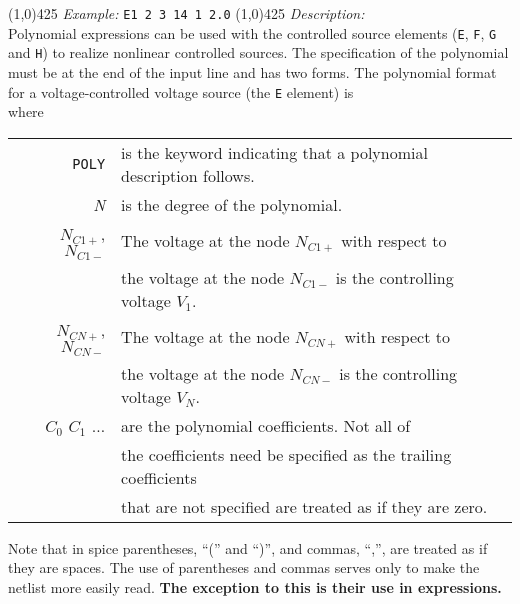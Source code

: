 \newline
\linethickness{0.5mm} \line(1,0){425}
\newline
\textit{Example:}
\newline
\texttt{E1 2 3 14 1 2.0}
\newline
\linethickness{0.5mm} \line(1,0){425}
\newline
\textit{Description:}\\
Polynomial expressions can be used with the controlled source
elements ({\tt E}, {\tt F}, {\tt G} and {\tt H}) to realize
nonlinear controlled sources. The specification of the polynomial
must be at the end of the input line and has two forms. The
polynomial format for a voltage-controlled voltage source (the
{\tt E} element) is\\[0.1in]
\hspace*{\fill}
\newline
where
\newline
\begin{tabular}{r l}
{\tt POLY} & is the keyword indicating that a polynomial
description follows.\\
{\it N} & is the degree of the polynomial.\\
$N_{C1+}$, $N_{C1-}$ & The voltage at the node $N_{C1+}$ with
respect to\\
& the voltage at the node $N_{C1-}$ is the controlling voltage
$V_1$.\\
$N_{CN+}$, $N_{CN-}$ & The voltage at the node $N_{CN+}$ with
respect to\\
& the voltage at the node $N_{CN-}$ is the controlling voltage
$V_N$.\\
$C_0$ $C_1$ $\ldots$ & are the polynomial coefficients. Not all
of\\
& the coefficients need be specified as the trailing
coefficients\\
& that are not specified are treated as if they are zero.
\end{tabular}

Note that in spice parentheses, ``('' and ``)'', and commas,
``,'', are treated as if they are spaces. The use of parentheses
and commas serves only to make the netlist more easily read. {\bf
The exception to this is their use in expressions.}

